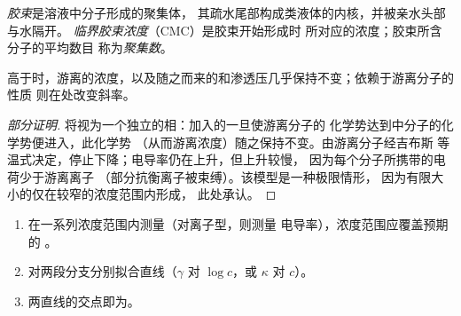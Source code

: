 \begin{definition}\label{def:b3:colloids:micelle}
\emph{胶束}是溶液中分子形成的聚集体，
其疏水尾部构成类液体的内核，并被亲水头部与水隔开。
\emph{临界胶束浓度}（CMC）是胶束开始形成时
所对应的浓度；胶束所含分子的平均数目
称为\emph{聚集数}。
\end{definition}

\begin{proposition}[临界胶束浓度处的转折]\label{prop:b3:colloids:cmc-break}
高于时，游离的浓度，以及随之而来的和渗透压几乎保持不变；依赖于游离分子的性质
则在处改变斜率。
\end{proposition}

\begin{proof}[部分证明]
将视为一个独立的相：加入的一旦使游离分子的
化学势达到中分子的化学势便进入，此化学势
（从而游离浓度）随之保持不变。由游离分子经吉布斯
等温式决定，停止下降；电导率仍在上升，但上升较慢，
因为每个分子所携带的电荷少于游离离子
（部分抗衡离子被束缚）。该模型是一种极限情形，
因为有限大小的仅在较窄的浓度范围内形成，
此处承认。
\end{proof}

\begin{method}[由转折点求临界胶束浓度]\label{met:b3:colloids:cmc}
\begin{enumerate}
  \item 在一系列浓度范围内测量（对离子型，则测量
        电导率），浓度范围应覆盖预期的
        。
  \item 对两段分支分别拟合直线（$\gamma$ 对 $\log c$，或 $\kappa$ 对 $c$）。
  \item 两直线的交点即为。
\end{enumerate}
\end{method}

